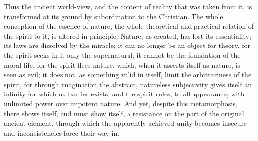 Thus the ancient world-view, and the content of reality that was taken from it, is transformed at its ground by subordination to the Christian. The whole conception of the essence of nature, the whole theoretical and practical relation of the spirit to it, is altered in principle. Nature, as created, has lost its essentiality; its laws are dissolved by the miracle; it can no longer be an object for theory, for the spirit seeks in it only the supernatural; it cannot be the foundation of the moral life, for the spirit flees nature, which, when it asserts itself as nature, is seen as evil; it does not, as something valid in itself, limit the arbitrariness of the spirit, for through imagination the abstract, natureless subjectivity gives itself an infinity for which no barrier exists, and the spirit rules, to all appearance, with unlimited power over impotent nature. And yet, despite this metamorphosis, there shows itself, and must show itself, a resistance on the part of the original ancient element, through which the apparently achieved unity becomes insecure and inconsistencies force their way in.

